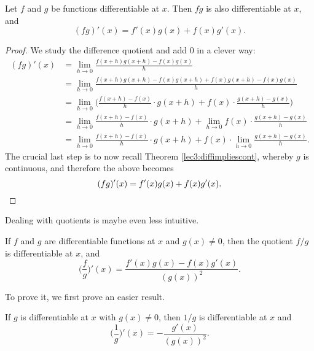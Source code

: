 \begin{theorem}
	Let $f$ and $g$ be functions differentiable at $x$.
	Then $f g$ is also differentiable at $x$, and
	\[
		(f g)'(x) = f'(x) g(x) + f(x) g'(x).
	\]
\end{theorem}

\begin{proof}
	We study the difference quotient and add $0$ in a clever way:
	\begin{align*}
		(f g)'(x) & = \lim_{h \to 0} \frac{f(x + h) g(x + h) - f(x) g(x)}{h}                                                         \\
		          & = \lim_{h \to 0} \frac{f(x + h) g(x + h) - f(x) g(x + h) + f(x) g(x + h) - f(x) g(x)}{h}                         \\
		          & = \lim_{h \to 0} \Big ( \frac{f(x + h) - f(x)}{h} \cdot g(x + h) + f(x) \cdot \frac{g(x + h) - g(x)}{h} \Big )   \\
		          & = \lim_{h \to 0} \frac{f(x + h) - f(x)}{h} \cdot g(x + h) + \lim_{h \to 0} f(x) \cdot \frac{g(x + h) - g(x)}{h}  \\
		          & = \lim_{h \to 0} \frac{f(x + h) - f(x)}{h} \cdot g(x + h) + f(x) \cdot \lim_{h \to 0} \frac{g(x + h) - g(x)}{h}.
	\end{align*}
	The crucial last step is to now recall Theorem \ref{lec3:diffimpliescont}, whereby $g$ is continuous, and therefore the above becomes
	\[
		(f g)'(x) = f'(x) g(x) + f(x) g'(x). \qedhere
	\]
\end{proof}

\noindent
Dealing with quotients is maybe even less intuitive.

\begin{theorem}
	If $f$ and $g$ are differentiable functions at $x$ and $g(x) \neq 0$, then the quotient $f / g$ is differentiable at $x$, and
	\[
		\Big ( \frac{f}{g} \Big )'(x) = \frac{f'(x) g(x) - f(x) g'(x)}{(g(x))^2}.
	\]
\end{theorem}

\noindent
To prove it, we first prove an easier result.

\begin{lemma}
	If $g$ is differentiable at $x$ with $g(x) \neq 0$, then $1 / g$ is differentiable at $x$ and
	\[
		\Big ( \frac{1}{g} \Big )'(x) = -\frac{g'(x)}{(g(x))^2}.
	\]
\end{lemma}

